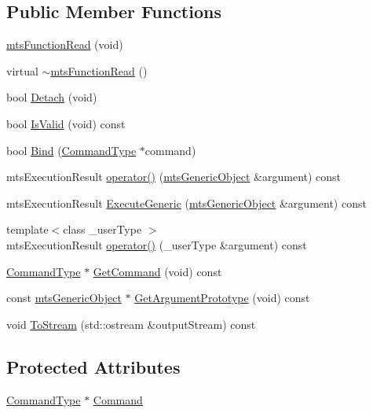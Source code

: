 \subsection*{Public Member Functions}
\begin{DoxyCompactItemize}
\item 
\hyperlink{classmts_function_read_ae791f29d3c9f2693ceb78bd71fa3d4fb}{mts\+Function\+Read} (void)
\item 
virtual \hyperlink{classmts_function_read_ad6186a1cc7dc8a6421614f1ad5b3e5bb}{$\sim$mts\+Function\+Read} ()
\item 
bool \hyperlink{classmts_function_read_a2699ffdba2c35a0ab4d4523087a54388}{Detach} (void)
\item 
bool \hyperlink{classmts_function_read_a7db527fe7b6259077e7f430a02aaf663}{Is\+Valid} (void) const 
\item 
bool \hyperlink{classmts_function_read_a72de23edef8c36bb005c4e3aee3f7ba3}{Bind} (\hyperlink{classmts_function_read_ac29fb3db043f94da5d51fe37860b1015}{Command\+Type} $\ast$command)
\item 
mts\+Execution\+Result \hyperlink{classmts_function_read_ac3935ec6461023a8c050360dbb38e502}{operator()} (\hyperlink{classmts_generic_object}{mts\+Generic\+Object} \&argument) const 
\item 
mts\+Execution\+Result \hyperlink{classmts_function_read_aaa874a5d2a1e8b611b4b4e598dccb710}{Execute\+Generic} (\hyperlink{classmts_generic_object}{mts\+Generic\+Object} \&argument) const 
\item 
{\footnotesize template$<$class \+\_\+user\+Type $>$ }\\mts\+Execution\+Result \hyperlink{classmts_function_read_afcef5572de1b1a9b5beb221368e10cb9}{operator()} (\+\_\+user\+Type \&argument) const 
\item 
\hyperlink{classmts_function_read_ac29fb3db043f94da5d51fe37860b1015}{Command\+Type} $\ast$ \hyperlink{classmts_function_read_a51014fa5c58bf17f256de7d9ad89771d}{Get\+Command} (void) const 
\item 
const \hyperlink{classmts_generic_object}{mts\+Generic\+Object} $\ast$ \hyperlink{classmts_function_read_a4473bcdb760ef64ba50e70a8e8d261d6}{Get\+Argument\+Prototype} (void) const 
\item 
void \hyperlink{classmts_function_read_a41f1739c5fbdaa2ccc8f46e806234f22}{To\+Stream} (std\+::ostream \&output\+Stream) const 
\end{DoxyCompactItemize}
\subsection*{Protected Attributes}
\begin{DoxyCompactItemize}
\item 
\hyperlink{classmts_function_read_ac29fb3db043f94da5d51fe37860b1015}{Command\+Type} $\ast$ \hyperlink{classmts_function_read_a42b24c58d52e1f0a2aa8bacaebc0f8b3}{Command}
\end{DoxyCompactItemize}
